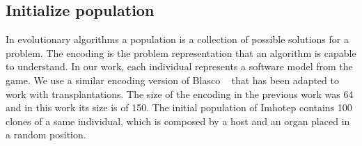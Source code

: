 \begin{table}[h]
\centering
{}
\caption{Mapping  of compatible boundaries between organ and host.}
\label{tab:boundaries}
\end{table}

\subsection{Initialize population}

In evolutionary algorithms a population is a collection of possible solutions for a problem.
The encoding is the problem representation that an algorithm is capable to understand. 
In our work, each individual represents a software model from the game.
We use a similar encoding version of Blasco \etal~\cite{blasco2021evolutionary} that has been adapted to work with transplantations. The size of the encoding in the previous work was 64 and in this work its size is of 150.
The initial population of Imhotep contains 100 clones of a same individual, which is composed by a host and an organ placed in a random position.

